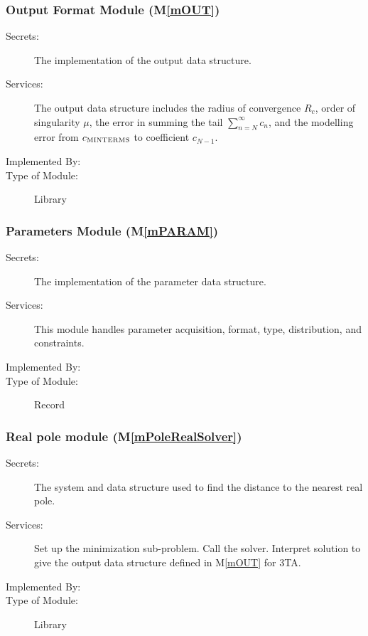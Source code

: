 \documentclass[12pt, titlepage]{article}
\newcommand{\mref}[1]{M\ref{#1}}
\begin{document}
\subsubsection{Output Format Module (\mref{mOUT})}

\begin{description}
\item[Secrets:] The implementation of the output data structure.
\item[Services:] The output data structure includes the radius of convergence $R_c$,
  order of singularity $\mu$, the error in summing the tail $\sum_{n=N}^{\infty} c_n$,
  and the modelling error from $c_{\text{\sc MINTERMS}}$ to coefficient $c_{N-1}$.
\item[Implemented By:] 
\item[Type of Module:] Library
\end{description}

\subsubsection{Parameters Module (\mref{mPARAM})}

\begin{description}
\item[Secrets:] The implementation of the parameter data structure.
\item[Services:] This module handles parameter acquisition, format, type, distribution, and constraints.
\item[Implemented By:] 
\item[Type of Module:] Record
\end{description}

\subsubsection{Real pole module (\mref{mPoleRealSolver})}

\begin{description}
\item[Secrets:] The system and data structure used to find the distance to the nearest real pole.
\item[Services:] Set up the minimization sub-problem. Call the solver. Interpret
  solution to give the output data structure defined in \mref{mOUT} for 3TA.
\item[Implemented By:] 
\item[Type of Module:] Library
\end{description}
\end{document}
